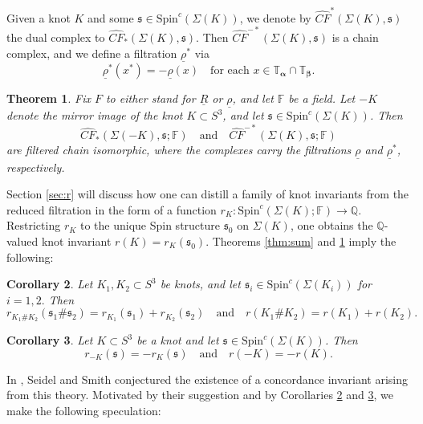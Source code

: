 \documentclass[11pt]{article}
\theoremstyle{plain} \newtheorem{thm}{Theorem}[subsection]
\theoremstyle{plain} \newtheorem{cor}[thm]{Corollary}
\theoremstyle{plain} \newtheorem{prop}[thm]{Proposition}
\theoremstyle{plain} \newtheorem{conj}[thm]{Conjecture}
\theoremstyle{plain} \newtheorem{lem}[thm]{Lemma}
\theoremstyle{definition} \newtheorem{df}[thm]{Definition}
\theoremstyle{remark} \newtheorem{rmk}[thm]{Remark}
\theoremstyle{remark} \newtheorem{obs}[thm]{Observation}
\newcommand{\DBC}[1]{\Sigma(#1)}
\newcommand{\red}[1]{\underline{#1}}
\newcommand{\ba}{\boldsymbol{\alpha}}
\newcommand{\bb}{\boldsymbol{\beta}}
\newcommand{\Ta}{\mathbb{T}_{\ba}}
\newcommand{\Tb}{\mathbb{T}_{\bb}}
\numberwithin{equation}{section}
\begin{document}
Given a knot $K$ and some $\mathfrak{s} \in \text{Spin}^{c}(\DBC{K})$, we denote by $\widehat{CF}^{*}(\DBC{K},\mathfrak{s})$ the dual complex to $\widehat{CF}_{*}(\DBC{K},\mathfrak{s})$.  Then $\widehat{CF}^{-*}(\DBC{K}, \mathfrak{s})$ is a chain complex, and we define a filtration $\red{\rho}^{*}$ via
\begin{equation*}
\red{\rho}^{*}(x^{*}) = -\red{\rho}(x) \quad \text{for each } x\in \Ta\cap \Tb.
\end{equation*}
\begin{thm}\label{thm:mirror}
Fix $F$ to either stand for $\red{R}$ or $\red{\rho}$, and let $\mathbb{F}$ be a field.  Let $-K$ denote the mirror image of the knot $K\subset S^{3}$, and let $\mathfrak{s} \in \text{Spin}^{c}(\DBC{K})$.  Then
\begin{equation*}
\widehat{CF}_{*}(\DBC{-K},\mathfrak{s}; \mathbb{F}) \quad \text{and} \quad \widehat{CF}^{-*}(\DBC{K},\mathfrak{s}; \mathbb{F})
\end{equation*}
are filtered chain isomorphic, where the complexes carry the filtrations $\red{\rho}$ and $\red{\rho}^{*}$, respectively.
\end{thm}

Section \ref{sec:r} will discuss how one can distill a family of knot invariants from the reduced filtration in the form of a function $r_{K}: \text{Spin}^{c}(\DBC{K}; \mathbb{F}) \rightarrow \mathbb{Q}$.  Restricting $r_{K}$ to the unique Spin structure $\mathfrak{s}_{0}$ on $\DBC{K}$, one obtains the $\mathbb{Q}$-valued knot invariant $r(K) = r_{K}(\mathfrak{s}_{0})$.  Theorems \ref{thm:sum} and \ref{thm:mirror} imply the following:

\begin{cor}\label{cor:sum}
Let $K_{1},K_{2} \subset S^{3}$ be knots, and let $\mathfrak{s}_{i} \in \text{Spin}^{c}(\DBC{K_{i}})$ for $i = 1,2.$  Then
$$r_{K_{1} \# K_{2}}(\mathfrak{s}_{1} \# \mathfrak{s}_{2})  = r_{K_{1}}(\mathfrak{s}_{1}) + r_{K_{2}}(\mathfrak{s}_{2}) \quad
\text{and} \quad r(K_{1} \# K_{2}) = r(K_{1}) + r(K_{2}).$$
\end{cor}

\begin{cor}\label{cor:mirror}
Let $K\subset S^{3}$ be a knot and let $\mathfrak{s} \in \text{Spin}^{c}(\DBC{K})$.  Then
$$r_{-K}(\mathfrak{s})  = - r_{K}(\mathfrak{s}) \quad
\text{and} \quad r(-K) = -r(K).$$
\end{cor}

In \cite{ss:R2}, Seidel and Smith conjectured the existence of a concordance invariant arising from this theory.  Motivated by their suggestion and by Corollaries \ref{cor:sum} and \ref{cor:mirror}, we make the following speculation:
\end{document}
